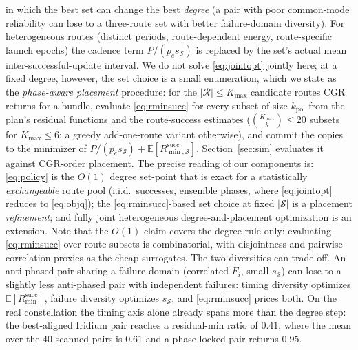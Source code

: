 \documentclass[twocolumn,3p,times,procedia]{elsarticle}
\theoremstyle{plain}
\theoremstyle{remark}
\newcommand{\E}{\mathbb{E}}
\newcommand{\peff}{p_e}
\begin{document}
in which the best set can change the best \emph{degree} (a pair with
poor common-mode reliability can lose to a three-route set with better
failure-domain diversity). For heterogeneous routes (distinct periods,
route-dependent energy, route-specific launch epochs) the cadence term
$P/(\peff s_{\mathcal{S}})$ is replaced by the set's actual mean
inter-successful-update interval. We do not solve \eqref{eq:jointopt}
jointly here; at a fixed degree, however, the set choice is a small
enumeration, which we state as the \emph{phase-aware placement}
procedure: for the $|\mathcal{R}|\le K_{\max}$ candidate routes CGR
returns for a bundle, evaluate \eqref{eq:rminsucc} for every subset of
size $k_{\mathrm{pol}}$ from the plan's residual functions and the
route-success estimates ($\binom{K_{\max}}{k}\le20$ subsets for
$K_{\max}\le6$; a greedy add-one-route variant otherwise), and commit
the copies to the minimizer of
$P/(\peff s_{\mathcal{S}})+\E[R^{\mathrm{succ}}_{\min,\mathcal{S}}]$.
Section~\ref{sec:sim} evaluates it against CGR-order placement.
The precise reading of our components is: \eqref{eq:policy} is the
$O(1)$ degree set-point that is exact for a statistically
\emph{exchangeable} route pool (i.i.d.\ successes, ensemble phases,
where \eqref{eq:jointopt} reduces to \eqref{eq:objq}); the
\eqref{eq:rminsucc}-based set choice at fixed $|\mathcal{S}|$ is a
placement \emph{refinement}; and fully joint heterogeneous
degree-and-placement optimization is an extension. Note that the $O(1)$
claim covers the degree rule only: evaluating \eqref{eq:rminsucc}
over route subsets is combinatorial, with disjointness and
pairwise-correlation proxies as the cheap surrogates. The two
diversities can trade off. An anti-phased pair sharing a failure domain
(correlated $F_i$, small $s_{\mathcal{S}}$) can lose to a slightly less
anti-phased pair with independent failures: timing diversity optimizes
$\E[R^{\mathrm{succ}}_{\min}]$, failure diversity optimizes
$s_{\mathcal{S}}$, and \eqref{eq:rminsucc} prices both.
On the real constellation the timing axis alone already spans more
than the degree step: the best-aligned Iridium pair reaches a
residual-min ratio of
$0.41$, where the mean over the $40$ scanned pairs is $0.61$ and a
phase-locked pair returns $0.95$.
\end{document}
